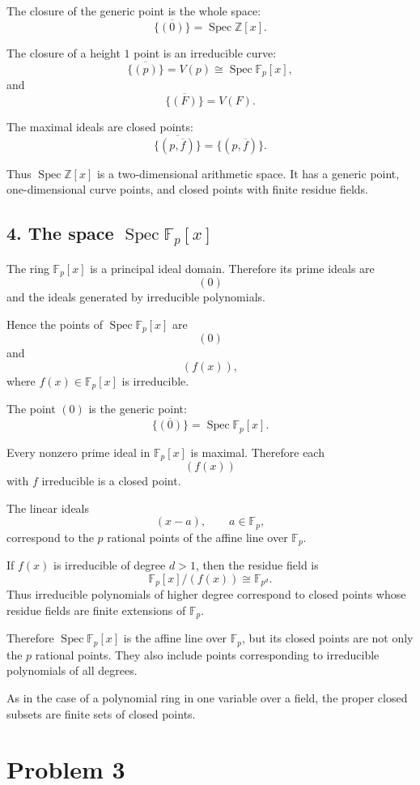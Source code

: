\documentclass[12pt,a4paper]{article}
\newcommand{\Spec}{\operatorname{Spec}}
\begin{document}
	The closure of the generic point is the whole space:
	\[
	\overline{\{(0)\}}=\Spec\mathbb Z[x].
	\]
	
	The closure of a height \(1\) point is an irreducible curve:
	\[
	\overline{\{(p)\}}=V(p)\cong \Spec\mathbb F_p[x],
	\]
	and
	\[
	\overline{\{(F)\}}=V(F).
	\]
	
	The maximal ideals are closed points:
	\[
	\overline{\{(p,\overline f)\}}=\{(p,\overline f)\}.
	\]
	
	Thus \(\Spec\mathbb Z[x]\) is a two-dimensional arithmetic space. It has a
	generic point, one-dimensional curve points, and closed points with finite
	residue fields.
	
	\subsection*{4. The space \(\Spec \mathbb F_p[x]\)}
	
	The ring \(\mathbb F_p[x]\) is a principal ideal domain. Therefore its prime
	ideals are
	\[
	(0)
	\]
	and the ideals generated by irreducible polynomials.
	
	Hence the points of \(\Spec\mathbb F_p[x]\) are
	\[
	(0)
	\]
	and
	\[
	(f(x)),
	\]
	where \(f(x)\in\mathbb F_p[x]\) is irreducible.
	
	The point \((0)\) is the generic point:
	\[
	\overline{\{(0)\}}=\Spec\mathbb F_p[x].
	\]
	
	Every nonzero prime ideal in \(\mathbb F_p[x]\) is maximal. Therefore each
	\[
	(f(x))
	\]
	with \(f\) irreducible is a closed point.
	
	The linear ideals
	\[
	(x-a),
	\qquad a\in \mathbb F_p,
	\]
	correspond to the \(p\) rational points of the affine line over \(\mathbb F_p\).
	
	If \(f(x)\) is irreducible of degree \(d>1\), then the residue field is
	\[
	\mathbb F_p[x]/(f(x))\cong \mathbb F_{p^d}.
	\]
	Thus irreducible polynomials of higher degree correspond to closed points whose
	residue fields are finite extensions of \(\mathbb F_p\).
	
	Therefore \(\Spec\mathbb F_p[x]\) is the affine line over \(\mathbb F_p\), but
	its closed points are not only the \(p\) rational points. They also include
	points corresponding to irreducible polynomials of all degrees.
	
	As in the case of a polynomial ring in one variable over a field, the proper
	closed subsets are finite sets of closed points.
	
	\section*{Problem 3}
	
\end{document}
